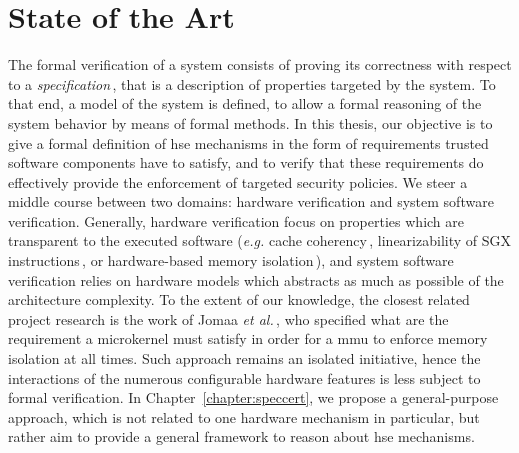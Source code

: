 \chapter{State of the Art}
\label{chapter:relatedwork}


%
\noindent
%
The formal verification of a system consists of proving its correctness with
respect to a \emph{specification}\,\cite{gupta1992formal}, that is a description
of properties targeted by the system.
%
To that end, a model of the system is defined, to allow a formal reasoning of
the system behavior by means of formal methods.
%
%
In this thesis, our objective is to give a formal definition of \ac{hse}
mechanisms in the form of requirements trusted software components have to
satisfy, and to verify that these requirements do effectively provide the
enforcement of targeted security policies.
%
We steer a middle course between two domains: hardware verification and system
software verification.
%
Generally, hardware verification focus on properties which are transparent to
the executed software (\emph{e.g.} cache
coherency\,\cite{stern1995cachecoherence}, linearizability of SGX
instructions\,\cite{leslie2015linsgx}, or hardware-based memory
isolation\,\cite{lie2003xom}), and system software verification relies on
hardware models which abstracts as much as possible of the architecture
complexity.
%
To the extent of our knowledge, the closest related project research is the work
of Jomaa \emph{et al.}\,\cite{jomaa2016mmu}, who specified what are the
requirement a microkernel must satisfy in order for a \ac{mmu} to enforce memory
isolation at all times.
%
Such approach remains an isolated initiative, hence the interactions of the
numerous configurable hardware features is less subject to formal verification.
%
In Chapter~\ref{chapter:speccert}, we propose a general-purpose approach, which
is not related to one hardware mechanism in particular, but rather aim to
provide a general framework to reason about \ac{hse} mechanisms.

